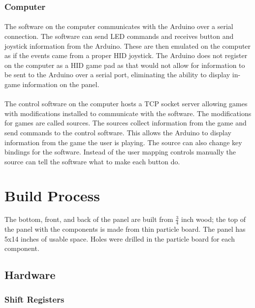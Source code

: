 \documentclass[12pt,a4paper]{article}
\begin{document}
			\subsubsection{Computer}
				\paragraph{}
				The software on the computer communicates with the Arduino over a serial connection. The software can send \gls{LED} commands and receives button and joystick information from the Arduino. These are then emulated on the computer as if the events came from a proper \gls{HID} joystick. The Arduino does not register on the computer as a \gls{HID} game pad as that would not allow for information to be sent to the Arduino over a serial port, eliminating the ability to display in-game information on the panel.
				\paragraph{}
				The control software on the computer hosts a \gls{TCP} socket server allowing games with modifications installed to communicate with the software. The modifications for games are called sources. The sources collect information from the game and send commands to the control software. This allows the Arduino to display information from the game the user is playing. The source can also change key bindings for the software. Instead of the user mapping controls manually the source can tell the software what to make each button do.

	\section{Build Process}
		\paragraph{}
			The bottom, front, and back of the panel are built from \(\frac{3}{4}\)  inch wood; the top of the panel with the components is made from thin particle board. The panel has 5x14 inches of usable space. Holes were drilled in the particle board for each component.

		\subsection{Hardware}
			\subsubsection{Shift Registers}
\end{document}
